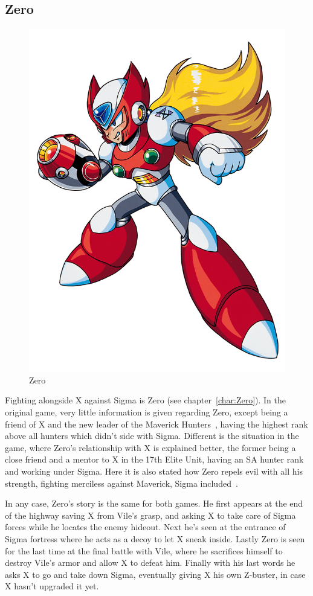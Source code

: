 \subsection{Zero}
\begin{figure}[htp]
	\centering
	\includegraphics[width=0.3\linewidth]{figures/X1/Zero_X1.png}
	\caption{Zero}
\end{figure}
Fighting alongside X against Sigma is Zero (see chapter~\ref{char:Zero}). In the original \x game, very little information is given regarding Zero, except being a friend of X and the new leader of the Maverick Hunters~\cite{X:Manual}, having the highest rank above all hunters which didn't side with Sigma. 
Different is the situation in the \mhx game, where Zero's relationship with X is explained better, the former being a close friend and a mentor to X in the 17th Elite Unit, having an SA hunter rank and working under Sigma. Here it is also stated how Zero repels evil with all his strength, fighting merciless against Maverick, Sigma included~\cite{Xcoll1:Manual_X1}.  

In any case, Zero’s story is the same for both games. He first appears at the end of the highway saving X from Vile's grasp, and asking X to take care of Sigma forces while he locates the enemy hideout. Next he's seen at the entrance of Sigma fortress where he acts as a decoy to let X sneak inside. Lastly Zero is seen for the last time at the final battle with Vile, where he sacrifices himself to destroy Vile's armor and allow X to defeat him. Finally with his last words he asks X to go and take down Sigma, eventually giving X his own Z-buster, in case X hasn't upgraded it yet.

